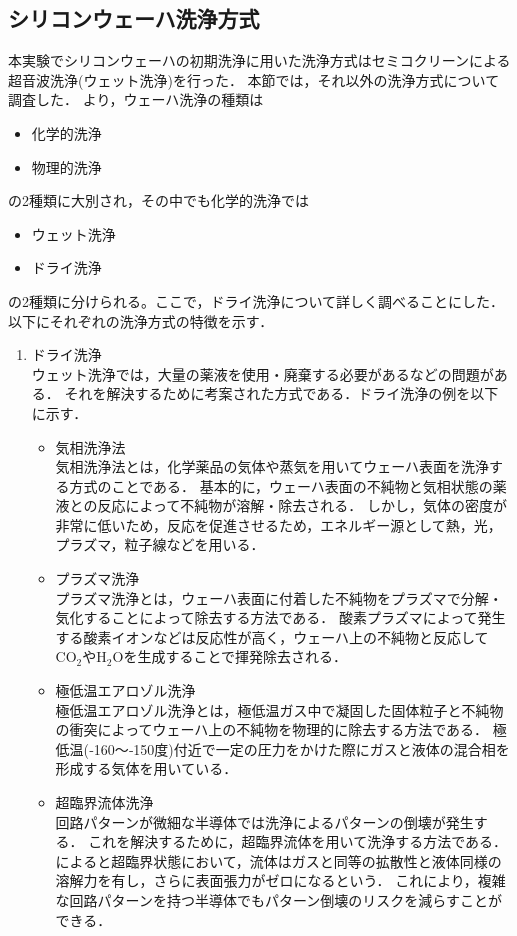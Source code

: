 \documentclass[11pt]{jarticle}
\begin{document}
	\subsection{シリコンウェーハ洗浄方式}
		本実験でシリコンウェーハの初期洗浄に用いた洗浄方式はセミコクリーンによる超音波洗浄(ウェット洗浄)を行った．
		本節では，それ以外の洗浄方式について調査した．
		\cite{ref:洗浄方式}より，ウェーハ洗浄の種類は
		\begin{itemize}
			\item 化学的洗浄
			\item 物理的洗浄
		\end{itemize}
		の2種類に大別され，その中でも化学的洗浄では
		\begin{itemize}
			\item ウェット洗浄
			\item ドライ洗浄
		\end{itemize}
		の2種類に分けられる。ここで，ドライ洗浄について詳しく調べることにした．
		以下にそれぞれの洗浄方式の特徴を示す．
		\begin{enumerate}
			\item ドライ洗浄\\
				ウェット洗浄では，大量の薬液を使用・廃棄する必要があるなどの問題がある．
				それを解決するために考案された方式である．ドライ洗浄の例を以下に示す．
				\begin{itemize}
					\item 気相洗浄法\\
						気相洗浄法とは，化学薬品の気体や蒸気を用いてウェーハ表面を洗浄する方式のことである．
						基本的に，ウェーハ表面の不純物と気相状態の薬液との反応によって不純物が溶解・除去される．
						しかし，気体の密度が非常に低いため，反応を促進させるため，エネルギー源として熱，光，プラズマ，粒子線などを用いる．
					\item プラズマ洗浄\\
						プラズマ洗浄とは，ウェーハ表面に付着した不純物をプラズマで分解・気化することによって除去する方法である．
						酸素プラズマによって発生する酸素イオンなどは反応性が高く，ウェーハ上の不純物と反応して$\mathrm{CO_{2}}や\mathrm{H_{2}O}$を生成することで揮発除去される．
					\item 極低温エアロゾル洗浄\\
						極低温エアロゾル洗浄とは，極低温ガス中で凝固した固体粒子と不純物の衝突によってウェーハ上の不純物を物理的に除去する方法である．
						極低温(‐160～‐150度)付近で一定の圧力をかけた際にガスと液体の混合相を形成する気体を用いている．
					\item 超臨界流体洗浄\\
						回路パターンが微細な半導体では洗浄によるパターンの倒壊が発生する．
						これを解決するために，超臨界流体を用いて洗浄する方法である．
						\cite{ref:洗浄方式}によると超臨界状態において，流体はガスと同等の拡散性と液体同様の溶解力を有し，さらに表面張力がゼロになるという．
						これにより，複雑な回路パターンを持つ半導体でもパターン倒壊のリスクを減らすことができる．
				\end{itemize}
		\end{enumerate}
\end{document}
